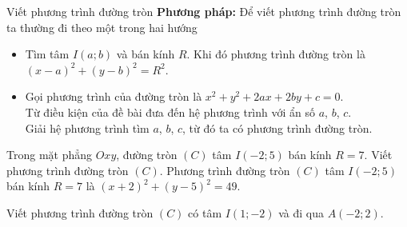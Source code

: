\begin{dang}{Viết phương trình đường tròn}
	\textbf{Phương pháp:} Để viết phương trình đường tròn ta thường đi theo một trong hai hướng
	\begin{itemize}
		\item Tìm tâm $I(a;b)$ và bán kính $R$. Khi đó phương trình đường tròn là $(x-a)^2+(y-b)^2=R^2$.
		\item Gọi phương trình của đường tròn là $x^2+y^2+2ax+2by+c=0$.\\
		Từ điều kiện của đề bài đưa đến hệ phương trình với ẩn số $a$, $b$, $c$.\\
		Giải hệ phương trình tìm $a$, $b$, $c$, từ đó ta có phương trình đường tròn.
	\end{itemize} 
\end{dang}

\begin{vd}%
	Trong mặt phẳng $Oxy$, đường tròn $(C)$ tâm $I(-2;5)$ bán kính $R = 7$. Viết phương trình đường tròn $(C)$.
	\loigiai
	{
		Phương trình đường tròn $(C)$ tâm $I(-2;5)$ bán kính $R = 7$ là $(x + 2)^2 + (y - 5)^2 = 49$.
	}
\end{vd}

\begin{vd}%
	Viết phương trình đường tròn $(C)$ có tâm $I(1;-2)$ và đi qua $A(-2;2)$.
\end{vd}

